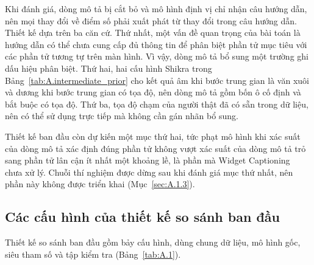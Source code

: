 Khi đánh giá, dòng mô tả bị cắt bỏ và mô hình định vị chỉ nhận câu hướng dẫn, nên mọi thay đổi về điểm số phải xuất phát từ thay đổi trong câu hướng dẫn. Thiết kế dựa trên ba căn cứ. Thứ nhất, một vấn đề quan trọng của bài toán là hướng dẫn có thể chưa cung cấp đủ thông tin để phân biệt phần tử mục tiêu với các phần tử tương tự trên màn hình. Vì vậy, dòng mô tả bổ sung một trường ghi dấu hiệu phân biệt. Thứ hai, hai cấu hình Shikra trong Bảng~\ref{tab:A.intermediate_prior} cho kết quả âm khi bước trung gian là văn xuôi và dương khi bước trung gian có tọa độ, nên dòng mô tả gồm bốn ô cố định và bắt buộc có tọa độ. Thứ ba, tọa độ chạm của người thật đã có sẵn trong dữ liệu, nên có thể sử dụng trực tiếp mà không cần gán nhãn bổ sung.

Thiết kế ban đầu còn dự kiến một mục thứ hai, tức phạt mô hình khi xác suất của dòng mô tả xác định đúng phần tử không vượt xác suất của dòng mô tả trỏ sang phần tử lân cận ít nhất một khoảng lề, là phần mà Widget Captioning~\cite{widgetcap} chưa xử lý. Chuỗi thí nghiệm được dừng sau khi đánh giá mục thứ nhất, nên phần này không được triển khai (Mục~\ref{sec:A.1.3}).

\subsection{Các cấu hình của thiết kế so sánh ban đầu}\label{sec:A.1.2}

Thiết kế so sánh ban đầu gồm bảy cấu hình, dùng chung dữ liệu, mô hình gốc, siêu tham số và tập kiểm tra (Bảng~\ref{tab:A.1}).

